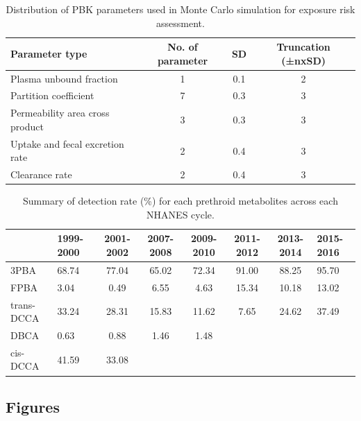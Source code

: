 \documentclass[toxics,article,submit,pdftex,moreauthors]{Definitions/mdpi}
\begin{document}
\begin{table}[H]
\begin{adjustwidth}{-4cm}{}
\caption{\label{tab:taba4}Distribution of PBK parameters used in Monte Carlo simulation for exposure risk assessment.}
\begin{tabular}[t]{lccc}
\toprule
Parameter type & No. of parameter & SD & Truncation (±nxSD)\\
\midrule
Plasma unbound fraction & 1 & 0.1 & 2\\
Partition coefficient & 7 & 0.3 & 3\\
Permeability area cross product & 3 & 0.3 & 3\\
Uptake and fecal excretion rate & 2 & 0.4 & 3\\
Clearance rate & 2 & 0.4 & 3\\
\bottomrule
\end{tabular}
\end{adjustwidth}
\end{table}


\begin{table}[H]
\begin{adjustwidth}{-4cm}{}
\caption{Summary of detection rate (\%) for each prethroid metabolites across each NHANES cycle.}
\label{tab:taba5}
\begin{tabular}{llcccccl}
\toprule
 & 1999-2000 & 2001-2002 & 2007-2008 & 2009-2010 & 2011-2012 & 2013-2014 & 2015-2016\\
\midrule
3PBA & 68.74 & 77.04 & 65.02 & 72.34 & 91.00 & 88.25 & 95.70\\
FPBA & 3.04 & 0.49 & 6.55 & 4.63 & 15.34 & 10.18 & 13.02\\
trans-DCCA & 33.24 & 28.31 & 15.83 & 11.62 & 7.65 & 24.62 & 37.49\\
DBCA & 0.63 & 0.88 & 1.46 & 1.48 &  &  & \\
cis-DCCA & 41.59 & 33.08 &  &  &  &  & \\
\bottomrule
\end{tabular}
\end{adjustwidth}
\end{table}

\subsection{Figures}
\end{document}
